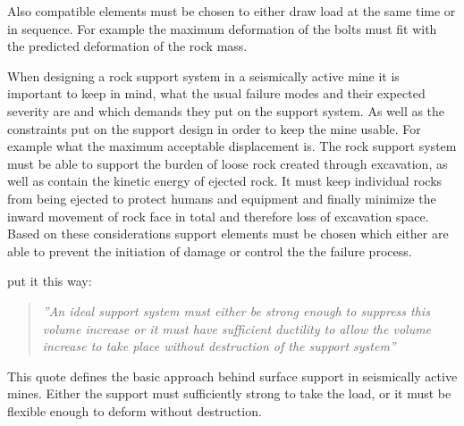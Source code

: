 Also compatible elements must be chosen to either draw load at the same time or in sequence. For example the maximum deformation of the bolts must fit with the predicted deformation of the rock mass. \autocite[6]{guler01} 


When designing a rock support system in a seismically active mine it is important to keep in mind, what the usual failure modes and their expected severity are and which demands they put on the support system. As well as the constraints put on the support design in order to keep the mine usable. For example what the maximum acceptable displacement is. The rock support system must be able to support the burden of loose rock created through excavation, as well as contain the kinetic energy of ejected rock. It must keep individual rocks from being ejected to protect humans and equipment and finally minimize the inward movement of rock face in total and therefore loss of excavation space. \autocite[4.35]{canada96}
Based on these considerations support elements must be chosen which either are able to prevent the initiation of damage or control the the failure process. \autocite[223]{Kaiser12} 

\textcite[2.8]{canada96} put it this way: 
\begin{quote}\textit{''An ideal support system must either be strong enough to suppress this volume increase or it must have sufficient ductility to allow the volume increase to take place  without destruction of the support system''}
\end{quote} This quote defines the basic approach behind surface support in seismically active mines. Either the support must sufficiently strong to take the load, or it must be flexible enough to deform without destruction. 

